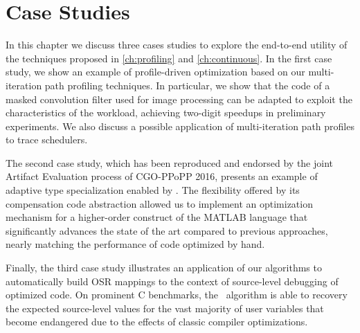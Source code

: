 \chapter{Case Studies}
\label{ch:case-studies}

In this chapter we discuss three cases studies to explore the end-to-end utility of the techniques proposed in \mychapter\ref{ch:profiling} and \mychapter\ref{ch:continuous}. In the first case study, we show an example of profile-driven optimization based on our multi-iteration path profiling techniques. In particular, we show that the code of a masked convolution filter used for image processing can be adapted to exploit the characteristics of the workload, achieving two-digit speedups in preliminary experiments. We also discuss a possible application of multi-iteration path profiles to trace schedulers.

The second case study, which has been reproduced and endorsed by the joint Artifact Evaluation process of CGO-PPoPP 2016, presents an example of adaptive type specialization enabled by \osrkit. The flexibility offered by its compensation code abstraction allowed us to implement an optimization mechanism for a higher-order construct of the MATLAB language that significantly advances the state of the art compared to previous approaches, nearly matching the performance of code optimized by hand.

Finally, the third case study illustrates an application of our algorithms to automatically build OSR mappings to the context of source-level debugging of optimized code. On prominent C benchmarks, the \reconstruct\ algorithm is able to recovery the expected source-level values for the vast majority of user variables that become endangered due to the effects of classic compiler optimizations.



